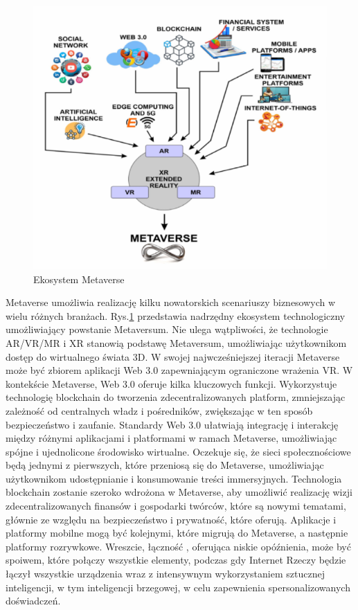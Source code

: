 \begin{figure}[!htbp]
    \centering
    \includegraphics[width=\textwidth]{images/metaverse/metaverseEcosystem.png}
    \caption{Ekosystem Metaverse\cite{metaverseSecurityIssuesChallengesAndViableZTAModel}}
    \label{metaverseEcosystemImage}
\end{figure}

Metaverse umożliwia realizację kilku nowatorskich scenariuszy biznesowych w wielu różnych branżach. Rys.\ref{metaverseEcosystemImage} przedstawia nadrzędny ekosystem technologiczny umożliwiający powstanie Metaversum. Nie ulega wątpliwości, że technologie AR/VR/MR i XR stanowią podstawę Metaversum, umożliwiając użytkownikom dostęp do wirtualnego świata 3D. W swojej najwcześniejszej iteracji Metaverse może być zbiorem aplikacji Web 3.0 zapewniającym ograniczone wrażenia VR. W kontekście Metaverse, Web 3.0 oferuje kilka kluczowych funkcji. Wykorzystuje technologię blockchain do tworzenia zdecentralizowanych platform, zmniejszając zależność od centralnych władz i pośredników, zwiększając w ten sposób bezpieczeństwo i zaufanie. Standardy Web 3.0 ułatwiają integrację i interakcję między różnymi aplikacjami i platformami w ramach Metaverse, umożliwiając spójne i ujednolicone środowisko wirtualne. Oczekuje się, że sieci społecznościowe będą jednymi z pierwszych, które przeniosą się do Metaverse, umożliwiając użytkownikom udostępnianie i konsumowanie treści immersyjnych. Technologia blockchain zostanie szeroko wdrożona w Metaverse, aby umożliwić realizację wizji zdecentralizowanych finansów i gospodarki twórców, które są nowymi tematami, głównie ze względu na bezpieczeństwo i prywatność, które oferują. Aplikacje i platformy mobilne mogą być kolejnymi, które migrują do Metaverse, a następnie platformy rozrywkowe. Wreszcie, łączność , oferująca niskie opóźnienia, może być spoiwem, które połączy wszystkie elementy, podczas gdy Internet Rzeczy będzie łączył wszystkie urządzenia wraz z intensywnym wykorzystaniem sztucznej inteligencji, w tym inteligencji brzegowej, w celu zapewnienia spersonalizowanych doświadczeń\cite{metaverseSecurityIssuesChallengesAndViableZTAModel}.


